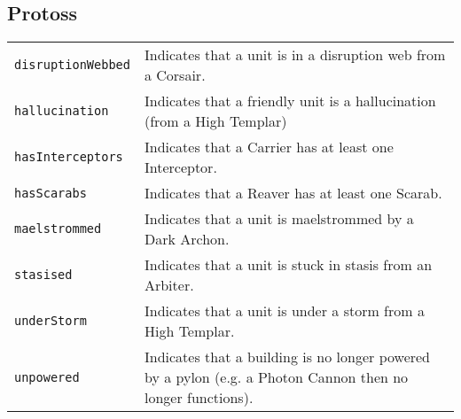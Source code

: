 \subsection{Protoss}
\begin{tabularx}{\textwidth}{lX}
 \verb|disruptionWebbed| & Indicates that a unit is in a disruption web from a Corsair. \\
 \verb|hallucination| & Indicates that a friendly unit is a hallucination (from a High Templar) \\
  \verb|hasInterceptors| & Indicates that a Carrier has at least one Interceptor. \\
 \verb|hasScarabs| & Indicates that a Reaver has at least one Scarab. \\
 \verb|maelstrommed| & Indicates that a unit is maelstrommed by a Dark Archon. \\
 \verb|stasised| & Indicates that a unit is stuck in stasis from an Arbiter. \\
 \verb|underStorm| & Indicates that a unit is under a storm from a High Templar. \\
 \verb|unpowered| & Indicates that a building is no longer powered by a pylon (e.g. a Photon Cannon then no longer functions).
\end{tabularx}